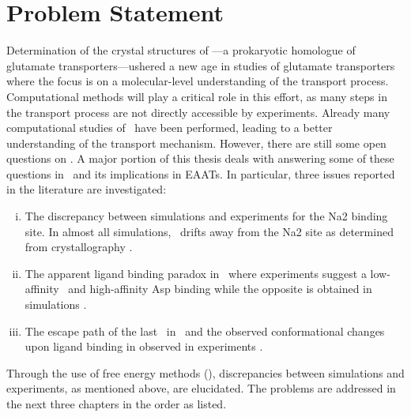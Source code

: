 \section{Problem Statement}
Determination of the crystal structures of \GltPh---a prokaryotic homologue of 
glutamate transporters---ushered a new age in studies of glutamate transporters 
where the focus is on a molecular-level understanding of the transport process. 
Computational methods will play a critical role in this effort, as many steps in 
the transport process are not directly accessible by experiments. Already many 
computational studies of \GltPh\ have been performed, leading to a better 
understanding of the transport mechanism. However, there are still some open 
questions on \GltPh. A major portion of this thesis deals with answering some 
of these questions in \GltPh\ and its implications in EAATs. In particular, 
three issues reported in the literature are investigated:
\begin{enumerate}[(i)]
\item The discrepancy between simulations and experiments for the Na2 binding 
      site. In almost all simulations, \Na\ drifts away from the Na2 site as 
      determined from crystallography \cite{DeChancie2011a,Heinzelmann2011,
      Heinzelmann2013,Heinzelmann2014a,Venkatesan2015}. 
\item The apparent ligand binding paradox in \GltPh\ where experiments suggest 
      a low-affinity \Na\ and high-affinity Asp binding \cite{Ewers2013,Hanelt2015} 
      while the opposite is obtained in simulations \cite{Heinzelmann2011,Heinzelmann2013}.
\item The escape path of the last \Na\ in \GltPh\ and the observed conformational changes
      upon ligand binding in observed in experiments \cite{Hanelt2015}.
\end{enumerate}

Through the use of free energy methods (), discrepancies 
between simulations and experiments, as mentioned above, are elucidated. The 
problems are addressed in the next three chapters in the order as listed. 
